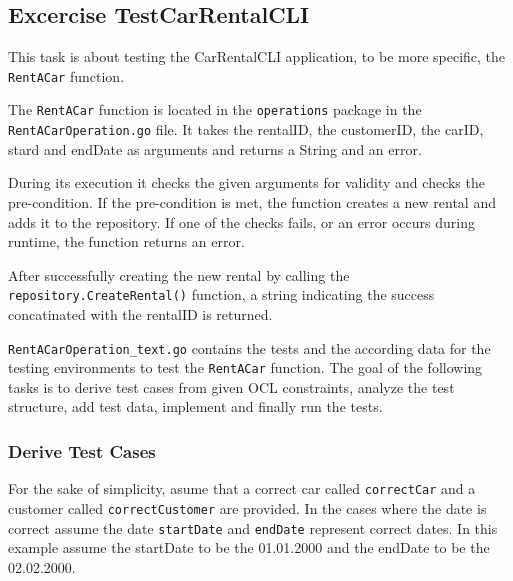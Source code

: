 \subsection{Excercise TestCarRentalCLI}
\label{sec:exercise_test_car_rental_cli}
This task is about testing the CarRentalCLI application, to be more specific, the \texttt{RentACar} function.

The \texttt{RentACar} function is located in the \texttt{operations} package in the \hfill \linebreak \texttt{RentACarOperation.go} file.
It takes the rentalID, the customerID, the carID, stard and endDate as arguments and returns a String and an error.

During its execution it checks the given arguments for validity and checks the pre-condition.
If the pre-condition is met, the function creates a new rental and adds it to the repository.
If one of the checks fails, or an error occurs during runtime, the function returns an error.

After successfully creating the new rental by calling the \texttt{repository.CreateRental()} function, a string indicating the success concatinated with the rentalID is returned.

\texttt{RentACarOperation\_text.go} contains the tests and the according data for the testing environments to test the \texttt{RentACar} function.
The goal of the following tasks is to derive test cases from given OCL constraints, analyze the test structure, add test data, implement and finally run the tests.

\subsubsection*{Derive Test Cases}
For the sake of simplicity, asume that a correct car called \texttt{correctCar} and a customer called \texttt{correctCustomer} are provided.
In the cases where the date is correct assume the date \texttt{startDate} and \texttt{endDate} represent correct dates.
In this example assume the startDate to be the 01.01.2000 and the endDate to be the 02.02.2000.


